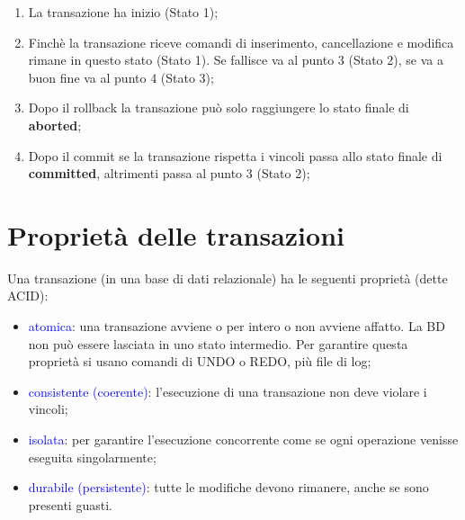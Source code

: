 \begin{enumerate}
    \item La transazione ha inizio (Stato 1);
    \item Finchè la transazione riceve comandi di inserimento, cancellazione e modifica rimane in questo stato (Stato 1). Se fallisce va al punto 3 (Stato 2), se va a buon fine va al punto 4 (Stato 3);
    \item Dopo il rollback la transazione può solo raggiungere lo stato finale di \textbf{aborted};
    \item Dopo il commit se la transazione rispetta i vincoli passa allo stato finale di \textbf{committed}, altrimenti passa al punto 3 (Stato 2);
\end{enumerate}

\section{Proprietà delle transazioni}

Una transazione (in una base di dati relazionale) ha le seguenti proprietà (dette ACID):

\begin{itemize}
    \item \textcolor{blue}{atomica}: una transazione avviene o per intero o non avviene affatto. La BD non può essere lasciata in uno stato intermedio. Per garantire questa proprietà si usano comandi di UNDO o REDO, più file di log;
    \item \textcolor{blue}{consistente (coerente)}: l'esecuzione di una transazione non deve violare i vincoli;
    \item \textcolor{blue}{isolata}: per garantire l'esecuzione concorrente come se ogni operazione venisse eseguita singolarmente;
    \item \textcolor{blue}{durabile (persistente)}: tutte le modifiche devono rimanere, anche se sono presenti guasti.
\end{itemize}